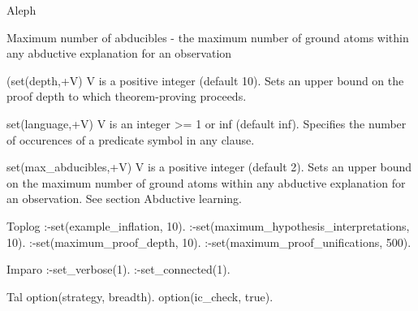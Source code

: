 Aleph
\item Maximum number of abducibles - the maximum number of ground atoms within any abductive explanation for an observation
\item (set(depth,+V) V is a positive integer (default 10). Sets an upper bound on the proof depth to which theorem-proving proceeds.
\item set(language,+V)
V is an integer >= 1 or inf (default inf). Specifies the number of occurences of a predicate symbol in any clause.
\item set(max\_abducibles,+V)
V is a positive integer (default 2). Sets an upper bound on the maximum number of ground atoms within any abductive explanation for an observation. See section Abductive learning.

Toplog
:-set(example_inflation, 10).
:-set(maximum_hypothesis_interpretations, 10).%
:-set(maximum_proof_depth, 10).%
:-set(maximum_proof_unifications, 500).%

Imparo
:-set_verbose(1).
:-set_connected(1).

Tal
option(strategy, breadth).
option(ic_check, true).
